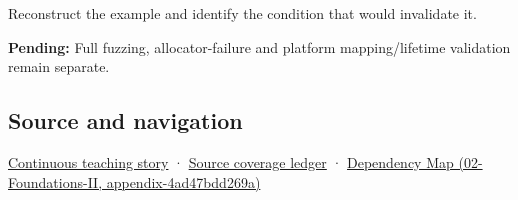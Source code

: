 Reconstruct the example and identify the condition that would invalidate it.

\textbf{Pending:} Full fuzzing, allocator-failure and platform mapping/lifetime validation remain separate.

\subsection{Source and navigation}\label{appendix-652d81568de9-source-and-navigation}

\hyperref[01-foundations-i-ch002-bytes-become-a-durable-agreement]{Continuous teaching story} · \hyperref[appendix-fd090d982a15]{Source coverage ledger} · \href{../02-Foundations-II/main.pdf\#nameddest=appendix-4ad47bdd269a}{Dependency Map (02-Foundations-II, appendix-4ad47bdd269a)}
